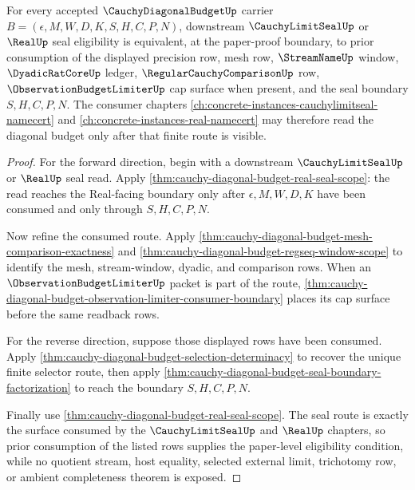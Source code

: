 \begin{theorem}
\label{thm:cauchy-diagonal-budget-limit-seal-eligibility}
For every accepted $\CauchyDiagonalBudgetUp$ carrier $B=(\epsilon,M,W,D,K,S,H,C,P,N)$, downstream $\CauchyLimitSealUp$ or $\RealUp$ seal eligibility is equivalent, at the paper-proof boundary, to prior consumption of the displayed precision row, mesh row, $\StreamNameUp$ window, $\DyadicRatCoreUp$ ledger, $\RegularCauchyComparisonUp$ row, $\ObservationBudgetLimiterUp$ cap surface when present, and the seal boundary $S,H,C,P,N$. The consumer chapters \autoref{ch:concrete-instances-cauchylimitseal-namecert} and \autoref{ch:concrete-instances-real-namecert} may therefore read the diagonal budget only after that finite route is visible.
\end{theorem}
\begin{proof}
For the forward direction, begin with a downstream $\CauchyLimitSealUp$ or $\RealUp$ seal read. Apply \autoref{thm:cauchy-diagonal-budget-real-seal-scope}: the read reaches the Real-facing boundary only after $\epsilon,M,W,D,K$ have been consumed and only through $S,H,C,P,N$.

Now refine the consumed route. Apply \autoref{thm:cauchy-diagonal-budget-mesh-comparison-exactness} and \autoref{thm:cauchy-diagonal-budget-regseq-window-scope} to identify the mesh, stream-window, dyadic, and comparison rows. When an $\ObservationBudgetLimiterUp$ packet is part of the route, \autoref{thm:cauchy-diagonal-budget-observation-limiter-consumer-boundary} places its cap surface before the same readback rows.

For the reverse direction, suppose those displayed rows have been consumed. Apply \autoref{thm:cauchy-diagonal-budget-selection-determinacy} to recover the unique finite selector route, then apply \autoref{thm:cauchy-diagonal-budget-seal-boundary-factorization} to reach the boundary $S,H,C,P,N$.

Finally use \autoref{thm:cauchy-diagonal-budget-real-seal-scope}. The seal route is exactly the surface consumed by the $\CauchyLimitSealUp$ and $\RealUp$ chapters, so prior consumption of the listed rows supplies the paper-level eligibility condition, while no quotient stream, host equality, selected external limit, trichotomy row, or ambient completeness theorem is exposed.
\end{proof}

